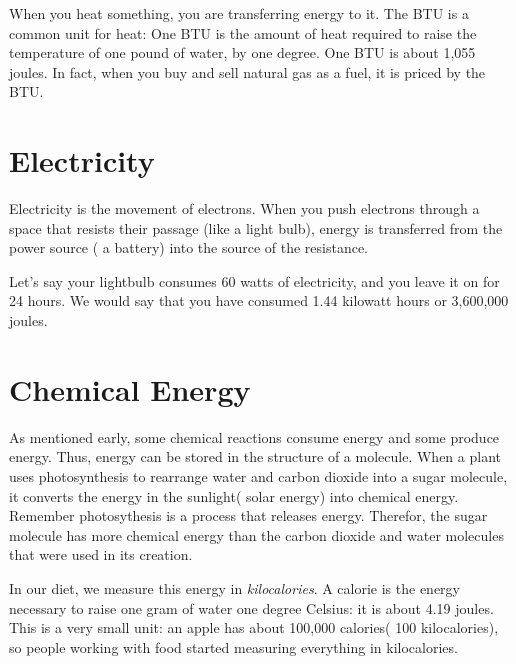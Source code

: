 When you heat something, you are transferring energy to it. The BTU
 is a common unit for heat: One BTU is the
amount of heat required to raise the temperature of one pound of water,
by one degree. One BTU is about 1,055 joules. In fact, when you buy and sell
natural gas as a fuel, it is priced by the BTU. 

\section{Electricity}

Electricity is the movement of electrons. When you push electrons
through a space that resists their passage (like a light bulb),
energy is transferred from the power source ( a battery)
 into the source of the resistance.

Let's say your lightbulb consumes 60 watts of electricity, and you leave it on for 24 hours.
We would say that you have consumed 1.44 kilowatt hours or 3,600,000 joules.


\section{Chemical Energy}

As mentioned early, some chemical reactions consume energy and some
produce energy. Thus, energy can be stored in the structure of a
molecule. When a plant uses photosynthesis to rearrange water and
carbon dioxide into a sugar molecule, it converts the energy in
the sunlight( solar energy) into chemical energy. Remember photosythesis is a process that releases energy.
Therefor, the sugar molecule has more chemical energy than the carbon dioxide and water molecules that were
used in its creation.

In our diet, we measure this energy in \textit{kilocalories}. A
calorie is the energy necessary to raise one gram of water one degree
Celsius: it is about 4.19 joules. This is a very small unit: an apple
has about 100,000 calories( 100 kilocalories), so people working with food started
measuring everything in kilocalories.

